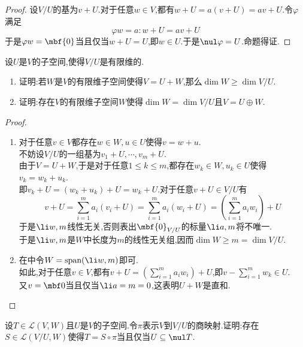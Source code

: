 \documentclass{ctexart}
\begin{document}
\begin{proof}
    设$V/U$的基为$v+U$.对于任意$w\in V$,都有$w+U=a(v+U)=av+U$.令$\varphi$满足
    $$\varphi w=a:w+U=av+U$$
    于是$\varphi w=\mbf{0}$当且仅当$w+U=U$,即$w\in U$.于是$\nul\varphi=U$.命题得证.
\end{proof}
\begin{problem}[18.]
    设$U$是$V$的子空间,使得$V/U$是有限维的.
    \begin{enumerate}[label=\tbf{(\arabic*)}]
        \item 证明:若$W$是$V$的有限维子空间使得$V=U+W$,那么$\dim W\geqslant\dim V/U$.
        \item 证明:存在$V$的有限维子空间$W$使得$\dim W=\dim V/U$且$V=U\oplus W$.
    \end{enumerate}
\end{problem}
\begin{proof}
    \begin{enumerate}[label=\tbf{(\arabic*)}]
        \item 对于任意$v\in V$都存在$w\in W,u\in U$使得$v=w+u$.\\
            不妨设$V/U$的一组基为$v_1+U,\cdots,v_m+U$.\\
            由于$V=U+W$,于是对于任意$1\leqslant k\leqslant m$,都存在$w_k\in W,u_k\in U$使得$v_k=w_k+u_k$.\\
            即$v_k+U=(w_k+u_k)+U=w_k+U$.对于任意$v+U\in V/U$有
            $$v+U=\sum_{i=1}^{m}a_i(v_i+U)=\sum_{i=1}^{m}a_i(w_i+U)=\left(\sum_{i=1}^{m}a_iw_i\right)+U$$
            于是$\li w,m$线性无关,否则表出$\mbf{0}_{V/U}$的标量$\li a,m$将不唯一.\\
            于是$\li w,m$是$W$中长度为$m$的线性无关组,因而$\dim W\geqslant m=\dim V/U$.
        \item 在中令$W=\text{span}(\li w,m)$即可.\\
            如此,对于任意$v\in V$,都有$\displaystyle v+U=\left(\sum_{i=1}^{m}a_iw_i\right)+U$,即$\displaystyle v-\sum_{i=1}^{m}w_k\in U$.\\
            又$v=\mbf0$当且仅当$\li a=m=0$,这表明$U+W$是直和.
    \end{enumerate}
\end{proof}
\begin{problem}[19.]
    设$T\in\mathcal{L}(V,W)$且$U$是$V$的子空间.令$\pi$表示$V$到$V/U$的商映射.证明:存在$S\in\mathcal{L}(V/U,W)$使得$T=S\circ\pi$当且仅当$U\subseteq\nul T$.
\end{problem}
\end{document}
